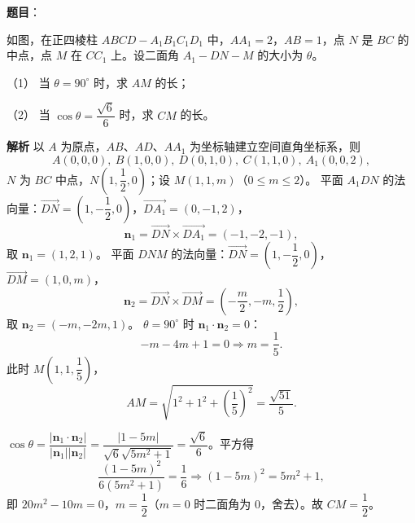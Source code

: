 \begin{answer}

\textbf{题目}：

如图，在正四棱柱 $ABCD-A_1B_1C_1D_1$ 中，$AA_1=2$，$AB=1$，点 $N$ 是 $BC$ 的中点，点 $M$ 在 $CC_1$ 上。设二面角 $A_1-DN-M$ 的大小为 $\theta$。

（1） 当 $\theta=90^\circ$ 时，求 $AM$ 的长；

（2） 当 $\cos\theta=\dfrac{\sqrt6}6$ 时，求 $CM$ 的长。
\nopagebreak[4]
\begin{center}\end{center}
\nopagebreak[4]
\textbf{解析}
以 $A$ 为原点，$AB$、$AD$、$AA_1$ 为坐标轴建立空间直角坐标系，则
\nopagebreak[4]
\[A(0,0,0),\ B(1,0,0),\ D(0,1,0),\ C(1,1,0),\ A_1(0,0,2),\]
$N$ 为 $BC$ 中点，$N\left(1,\dfrac12,0\right)$；设 $M(1,1,m)$（$0\leqslant m\leqslant2$）。
平面 $A_1DN$ 的法向量：$\overrightarrow{DN}=\left(1,-\dfrac12,0\right)$，$\overrightarrow{DA_1}=(0,-1,2)$，
\nopagebreak[4]
\[\boldsymbol n_1=\overrightarrow{DN}\times\overrightarrow{DA_1}=(-1,-2,-1),\]
取 $\boldsymbol n_1=(1,2,1)$。
平面 $DNM$ 的法向量：$\overrightarrow{DN}=\left(1,-\dfrac12,0\right)$，$\overrightarrow{DM}=(1,0,m)$，
\nopagebreak[4]
\[\boldsymbol n_2=\overrightarrow{DN}\times\overrightarrow{DM}=\left(-\frac m2,-m,\frac12\right),\]
取 $\boldsymbol n_2=(-m,-2m,1)$。
$\theta=90^\circ$ 时 $\boldsymbol n_1\cdot\boldsymbol n_2=0$：
\nopagebreak[4]
\[-m-4m+1=0\Longrightarrow m=\frac15.\]
此时 $M\left(1,1,\dfrac15\right)$，
\nopagebreak[4]
\[AM=\sqrt{1^2+1^2+\left(\frac15\right)^2}=\frac{\sqrt{51}}5.\]

$\cos\theta=\dfrac{|\boldsymbol n_1\cdot\boldsymbol n_2|}{|\boldsymbol n_1||\boldsymbol n_2|}=\dfrac{|1-5m|}{\sqrt6\sqrt{5m^2+1}}=\dfrac{\sqrt6}6$。平方得
\nopagebreak[4]
\[\frac{(1-5m)^2}{6(5m^2+1)}=\frac16\Longrightarrow(1-5m)^2=5m^2+1,\]
即 $20m^2-10m=0$，$m=\dfrac12$（$m=0$ 时二面角为 $0$，舍去）。故 $CM=\dfrac12$。



\end{answer}
